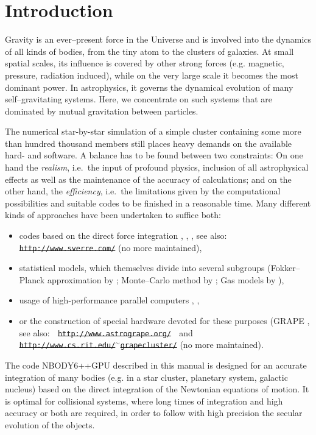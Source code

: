 
\section{Introduction}


Gravity is an ever--present force in the Universe
and is involved into the dynamics of all kinds of bodies,
from the tiny atom to the clusters of galaxies.
At small spatial scales, its influence is covered by other
strong forces (e.g. magnetic, pressure, radiation induced),
while on the very large scale it becomes the most dominant
power.
In astrophysics, it governs the dynamical evolution of
many self--gravitating systems.
Here, we concentrate on such systems that are dominated
by mutual gravitation between particles.

The numerical star-by-star simulation of a simple cluster
containing some more than hundred thousand members still
places heavy demands on the available hard- and software.
A balance has to be found between two constraints:
On one hand the \emph{realism}, i.e.\ the input of
profound physics, inclusion of all astrophysical effects
as well as the maintenance of the accuracy of calculations;
and on the other hand, the \emph{efficiency}, i.e.\
the limitations given by the computational possibilities
and suitable codes to be finished in a reasonable time.
Many different kinds of approaches have been undertaken
to suffice both:
\begin{itemize}
\item codes based on the direct force integration
      \cite{a_85}, \cite{a_99b}, \cite{a_03}, see also:\\
      \sout{{\tt http://www.sverre.com/}} (no more maintained),
\item statistical models, which themselves divide into
      several subgroups
      (Fokker--Planck approximation by \cite{c_80};
      Monte--Carlo method by \cite{h_71};
      Gas models by \cite{s_94}),
\item usage of high-performance parallel computers
      \cite{s_99}, \cite{dhm_03},
\item or the construction of special hardware devoted
      for these purposes (GRAPE \cite{mtes_97},
      see also: $\;$ \sout{{\tt http://www.astrogrape.org/}}
      $\;$ and $\;$ \\
      \sout{{\tt http://www.cs.rit.edu/$^{\sim}$grapecluster/}} (no more maintained).
\end{itemize}

The code NBODY6++GPU described in this manual is designed for
an accurate integration of many bodies
(e.g. in a star cluster, planetary system, galactic nucleus)
based on the direct integration of the Newtonian equations
of motion.
It is optimal for collisional systems, where long times of
integration and high accuracy or both are required, in order
to follow with high precision the secular evolution of the objects.

